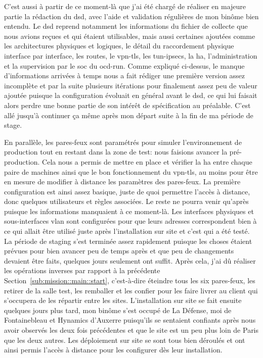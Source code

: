 \documentclass[12pt, oneside, a4paper, titlepage]{report}
\begin{document}
C'est aussi à partir de ce moment-là que j'ai été chargé de réaliser en majeure
partie la rédaction du \acrfull{dsd}, avec l'aide et validation régulières de
mon binôme bien entendu. Le \gls{dsd} reprend notamment les informations du
fichier de collecte que nous avions reçues et qui étaient utilisables, mais
aussi certaines ajoutées comme les architectures physiques et logiques, le
détail du raccordement physique interface par interface, les routes, le
\gls{vpn-tls}, les \glspl{tun-ipsec}, la \acrfull{ha}, l'administration et la
supervision par le \gls{soc} du \gls{ocd-run}. Comme expliqué ci-dessus, le
manque d'informations arrivées à temps nous a fait rédiger une première version
assez incomplète et par la suite plusieurs itérations pour finalement assez peu
de valeur ajoutée puisque la configuration évoluait en général avant le
\gls{dsd}, ce qui lui faisait alors perdre une bonne partie de son intérêt de
spécification au préalable. C'est allé jusqu'à continuer ça même après mon
départ suite à la fin de ma période de stage.

En parallèle, les pares-feux sont paramétrés pour simuler l'environnement de
production tout en restant dans la zone de test: nous faisions avancer la
pré-production. Cela nous a permis de mettre en place et vérifier la \gls{ha}
entre chaque paire de machines ainsi que le bon fonctionnement du \gls{vpn-tls},
au moins pour être en mesure de modifier à distance les paramètres des
pares-feux. La première configuration est ainsi assez basique, juste de quoi
permettre l'accès à distance, donc quelques utilisateurs et règles associées. Le
reste ne pourra venir qu'après puisque les informations manquaient à ce
moment-là. Les interfaces physiques et sous-interfaces \gls{vlan} sont
configurées pour que leurs adresses correspondent bien à ce qui allait être
utilisé juste après l'installation sur site et c'est qui a été testé. La période
de \gls{staging} s'est terminée assez rapidement puisque les choses étaient
prévues pour bien avancer peu de temps après et que peu de changements devaient
être faits, quelques jours seulement ont suffit. Après cela, j'ai dû réaliser
les opérations inverses par rapport à la précédente
Section~\ref{sub:mission::main::start}, c'est-à-dire éteindre tous les six
pares-feux, les retirer de la salle test, les remballer et les confier pour les
faire livrer au client qui s'occupera de les répartir entre les sites.
L'installation sur site se fait ensuite quelques jours plus tard, mon binôme
s'est occupé de La Défense, moi de Fontainebleau et Hynamics d'Auxerre
puisqu'ils se sentaient confiants après nous avoir observés les deux fois
précédentes et que le site est un peu plus loin de Paris que les deux autres.
Les déploiement sur site se sont tous bien déroulés et ont ainsi permis l'accès
à distance pour les configurer dès leur installation.
\end{document}
